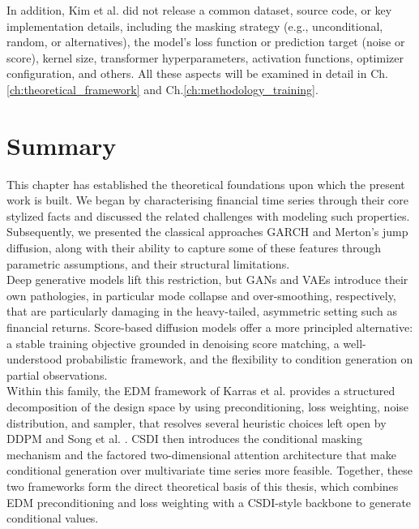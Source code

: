 In addition, Kim et al.\cite{kim2025diffusion} did not release a common dataset, source code, or key implementation details, including the masking strategy (e.g., unconditional, random, or alternatives), the model’s loss function or prediction target (noise or score), kernel size, transformer hyperparameters, activation functions, optimizer configuration, and others. All these aspects will be examined in detail in Ch.\ref{ch:theoretical_framework} and Ch.\ref{ch:methodology_training}.
\section{Summary}

This chapter has established the theoretical foundations upon which the present work is built. We began by characterising financial time series through their core stylized facts and discussed the related challenges with modeling such properties. Subsequently, we presented the classical approaches GARCH and Merton's jump diffusion, along with their ability to capture some of these features through parametric assumptions, and their structural limitations.\\

Deep generative models lift this restriction, but GANs and VAEs introduce their own pathologies, in particular mode collapse and over-smoothing, respectively, that are particularly damaging in the heavy-tailed, asymmetric setting such as financial returns. Score-based diffusion models offer a more principled alternative: a stable training objective grounded in denoising score matching, a well-understood probabilistic framework, and the flexibility to condition generation on partial observations.\\

Within this family, the EDM framework of Karras et al.\cite{karras2022elucidating} provides a structured decomposition of the design space by using preconditioning, loss weighting, noise distribution, and sampler, that resolves several heuristic choices left open by DDPM and Song et al. \cite{ho2020ddpm, song2021score}. CSDI \cite{tashiro2021csdi} then introduces the conditional masking mechanism and the factored two-dimensional attention architecture that make conditional generation over multivariate time series more feasible. Together, these two frameworks form the direct theoretical basis of this thesis, which combines EDM preconditioning and loss weighting with a CSDI-style backbone to generate conditional values.\\

